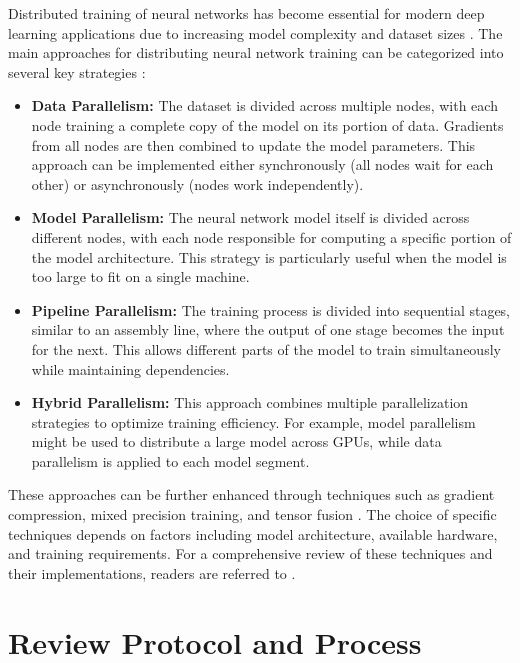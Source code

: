 Distributed training of neural networks has become essential for modern deep learning applications
due to increasing model complexity and dataset sizes \cite{chahal_hitchhikers_2018}. The main
approaches for distributing neural network training can be categorized into several key strategies
\cite{dehghani_distributed_2023}:

\begin{itemize}
	\item \textbf{Data Parallelism:}
	      The dataset is divided across multiple nodes, with each node training a complete copy of the
	      model on its portion of data. Gradients from all nodes are then combined to update the model parameters.
	      This approach can be implemented either synchronously (all nodes wait for each other) or asynchronously (nodes work independently).

	\item \textbf{Model Parallelism:}
	      The neural network model itself is divided across different nodes, with each node responsible
	      for computing a specific portion of the model architecture. This strategy is particularly useful
	      when the model is too large to fit on a single machine.

	\item \textbf{Pipeline Parallelism:}
	      The training process is divided into sequential stages, similar to an assembly line,
	      where the output of one stage becomes the input for the next. This allows different parts
	      of the model to train simultaneously while maintaining dependencies.

	\item \textbf{Hybrid Parallelism:}
	      This approach combines multiple parallelization strategies to optimize training efficiency.
	      For example, model parallelism might be used to distribute a large model across GPUs, while
	      data parallelism is applied to each model segment.
\end{itemize}

These approaches can be further enhanced through techniques such as gradient compression, mixed
precision training, and tensor fusion \cite{dehghani_distributed_2023}. The choice of specific
techniques depends on factors including model architecture, available hardware, and training
requirements. For a comprehensive review of these techniques and their implementations, readers are
referred to \cite{chahal_hitchhikers_2018}.

\section{Review Protocol and Process}
\label{sec:protocol}

